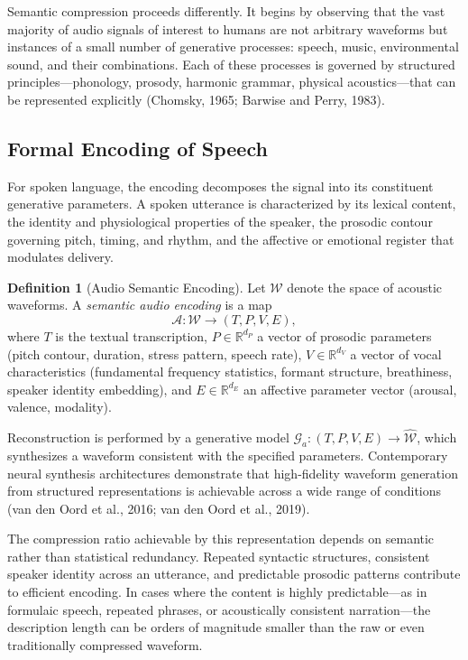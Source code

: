 \documentclass[11pt,a4paper]{article}
\theoremstyle{definition}
\newtheorem{definition}[theorem]{Definition}
\theoremstyle{remark}
\begin{document}
Semantic compression proceeds differently. It begins by observing that the vast majority of audio signals of interest to humans are not arbitrary waveforms but instances of a small number of generative processes: speech, music, environmental sound, and their combinations. Each of these processes is governed by structured principles---phonology, prosody, harmonic grammar, physical acoustics---that can be represented explicitly (Chomsky, 1965; Barwise and Perry, 1983).

\subsection{Formal Encoding of Speech}

For spoken language, the encoding decomposes the signal into its constituent generative parameters. A spoken utterance is characterized by its lexical content, the identity and physiological properties of the speaker, the prosodic contour governing pitch, timing, and rhythm, and the affective or emotional register that modulates delivery.

\begin{definition}[Audio Semantic Encoding]
Let $\mathcal{W}$ denote the space of acoustic waveforms. A \emph{semantic audio encoding} is a map
\[
\mathcal{A} : \mathcal{W} \rightarrow (T, P, V, E),
\]
where $T$ is the textual transcription, $P \in \mathbb{R}^{d_P}$ a vector of prosodic parameters (pitch contour, duration, stress pattern, speech rate), $V \in \mathbb{R}^{d_V}$ a vector of vocal characteristics (fundamental frequency statistics, formant structure, breathiness, speaker identity embedding), and $E \in \mathbb{R}^{d_E}$ an affective parameter vector (arousal, valence, modality).
\end{definition}

Reconstruction is performed by a generative model $\mathcal{G}_a : (T, P, V, E) \rightarrow \widehat{\mathcal{W}}$, which synthesizes a waveform consistent with the specified parameters. Contemporary neural synthesis architectures demonstrate that high-fidelity waveform generation from structured representations is achievable across a wide range of conditions (van den Oord et al., 2016; van den Oord et al., 2019).

The compression ratio achievable by this representation depends on semantic rather than statistical redundancy. Repeated syntactic structures, consistent speaker identity across an utterance, and predictable prosodic patterns contribute to efficient encoding. In cases where the content is highly predictable---as in formulaic speech, repeated phrases, or acoustically consistent narration---the description length can be orders of magnitude smaller than the raw or even traditionally compressed waveform.
\end{document}

